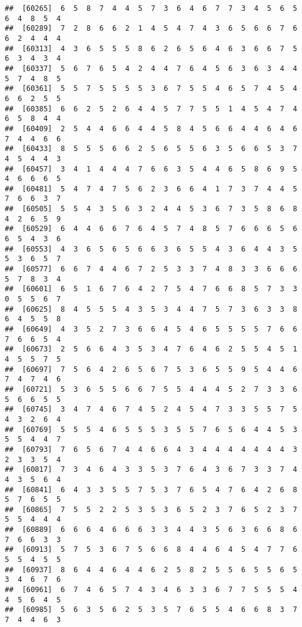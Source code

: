 \documentclass[
]{book}
\begin{document}
\begin{verbatim}
##  [60265]  6  5  8  7  4  4  5  7  3  6  4  6  7  7  3  4  5  6  5  6  4  8  5  4
##  [60289]  7  2  8  6  6  2  1  4  5  4  7  4  3  6  5  6  6  7  6  6  2  4  4  4
##  [60313]  4  3  6  5  5  5  8  6  2  6  5  6  4  6  3  6  6  7  5  6  3  4  3  4
##  [60337]  5  6  7  6  5  4  2  4  4  7  6  4  5  6  3  6  3  4  4  5  7  4  8  5
##  [60361]  5  5  7  5  5  5  5  3  6  7  5  5  4  6  5  7  4  5  4  6  6  2  5  5
##  [60385]  6  6  2  5  2  6  4  4  5  7  7  5  5  1  4  5  4  7  4  6  5  8  4  4
##  [60409]  2  5  4  4  6  6  4  4  5  8  4  5  6  6  4  4  6  4  6  7  4  4  6  6
##  [60433]  8  5  5  5  6  6  2  5  6  5  5  6  3  5  6  6  5  3  7  4  5  4  4  3
##  [60457]  3  4  1  4  4  4  7  6  6  3  5  4  4  6  5  8  6  9  5  4  6  6  6  5
##  [60481]  5  4  7  4  7  5  6  2  3  6  6  4  1  7  3  7  4  4  5  7  6  6  3  7
##  [60505]  5  5  4  3  5  6  3  2  4  4  5  3  6  7  3  5  8  6  8  4  2  6  5  9
##  [60529]  6  4  4  6  6  7  6  4  5  7  4  8  5  7  6  6  6  5  6  6  5  4  3  6
##  [60553]  4  3  6  5  6  5  6  6  3  6  5  5  4  3  6  4  4  3  5  5  3  6  5  7
##  [60577]  6  6  7  4  4  6  7  2  5  3  3  7  4  8  3  3  6  6  6  5  7  8  3  4
##  [60601]  6  5  1  6  7  6  4  2  7  5  4  7  6  6  8  5  7  3  3  0  5  5  6  7
##  [60625]  8  4  5  5  5  4  3  5  3  4  4  7  5  7  3  6  3  3  8  6  4  5  5  8
##  [60649]  4  3  5  2  7  3  6  6  4  5  4  6  5  5  5  5  7  6  6  7  6  6  5  4
##  [60673]  2  5  6  6  4  3  5  3  4  7  6  4  6  2  5  5  4  5  1  4  5  5  7  5
##  [60697]  7  5  6  4  2  6  5  6  7  5  3  6  5  5  9  5  4  4  6  7  4  7  4  6
##  [60721]  5  3  6  5  5  6  6  7  5  5  4  4  4  5  2  7  3  3  6  5  6  6  5  5
##  [60745]  3  4  7  4  6  7  4  5  2  4  5  4  7  3  3  5  5  7  5  4  3  2  6  4
##  [60769]  5  5  5  4  6  5  5  5  3  5  5  7  6  5  6  4  4  5  3  5  5  4  4  7
##  [60793]  7  6  5  6  7  4  4  6  6  4  3  4  4  4  4  4  4  4  3  2  3  3  5  4
##  [60817]  7  3  4  6  4  3  3  5  3  7  6  4  3  6  7  3  3  7  4  4  3  5  6  4
##  [60841]  6  4  3  3  5  5  7  5  3  7  6  5  4  7  6  4  2  6  8  5  7  6  5  5
##  [60865]  7  5  5  2  2  5  3  5  3  6  5  2  3  7  6  5  2  3  7  5  5  4  4  4
##  [60889]  6  6  6  4  6  6  6  3  3  4  4  3  5  6  3  6  6  8  6  7  6  6  3  3
##  [60913]  5  7  5  3  6  7  5  6  6  8  4  4  6  4  5  4  7  7  6  5  5  4  5  5
##  [60937]  8  6  4  4  6  4  4  6  2  5  8  2  5  5  6  5  5  6  5  3  4  6  7  6
##  [60961]  6  7  4  6  5  7  4  3  4  6  3  3  6  7  7  5  5  5  4  4  5  6  4  5
##  [60985]  5  6  3  5  6  2  5  3  5  7  6  5  5  4  6  6  8  3  7  7  4  4  6  3

\end{verbatim}
\end{document}
